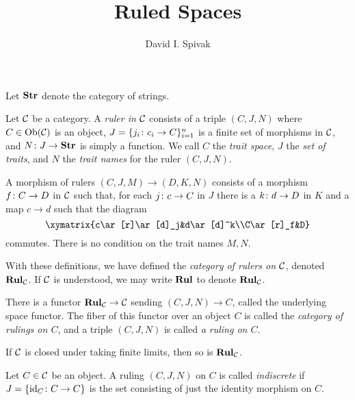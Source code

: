 \documentclass{amsart}
\def\Rul{{\bf Rul}}
\def\Str{{\bf Str}}
\begin{document}
\title{Ruled Spaces}

\author{David I. Spivak}

\maketitle

Let $\Str$ denote the category of strings.

\begin{definition}

Let $\mathcal{C}$ be a category.  A {\em ruler in $\mathcal{C}$} consists of a triple $(C,J,N)$ where $C\in\textnormal{Ob}(\mathcal{C})$ is an object, $J=\{j_i\colon c_i\rightarrow C\}_{i=1}^n$ is a finite set of morphisms in $\mathcal{C}$, and $N\taking J\to\Str$ is simply a function.  We call $C$ the {\em trait space}, $J$ the {\em set of traits}, and $N$ the {\em trait names} for the ruler $(C,J,N)$.

A morphism of rulers $(C,J,M)\to (D,K,N)$ consists of a morphism $f\colon C\rightarrow D$ in $\mathcal{C}$ such that, for each $j\colon c\rightarrow C$ in $J$ there is a $k\colon d\rightarrow D$ in $K$ and a map $c\to d$ such that the diagram $$\xymatrix{c\ar[r]\ar[d]_j&d\ar[d]^k\\C\ar[r]_f&D}$$ commutes.  There is no condition on the trait names $M,N$.

With these definitions, we have defined the {\em category of rulers on $\mathcal{C}$}, denoted $\Rul_\mcC$.  If $\mathcal{C}$ is understood, we may write $\Rul$ to denote $\Rul_\mcC$.

There is a functor $\Rul_\mcC\to\mcC$ sending $(C,J,N)\to C$, called the underlying space functor.  The fiber of this functor over an object $C$ is called the {\em category of rulings on $C$}, and a triple $(C,J,N)$ is called {\em a ruling on $C$}.

\end{definition}

\begin{lemma}

If $\mathcal{C}$ is closed under taking finite limits, then so is $\Rul_\mcC$.

\end{lemma}

\begin{definition}

Let $C\in\mathcal{C}$ be an object.  A ruling $(C,J,N)$ on $C$ is called {\em indiscrete} if $J=\{\textnormal{id}_C\colon C\rightarrow C\}$ is the set consisting of just the identity morphism on $C$.  

\end{definition}
\end{document}
